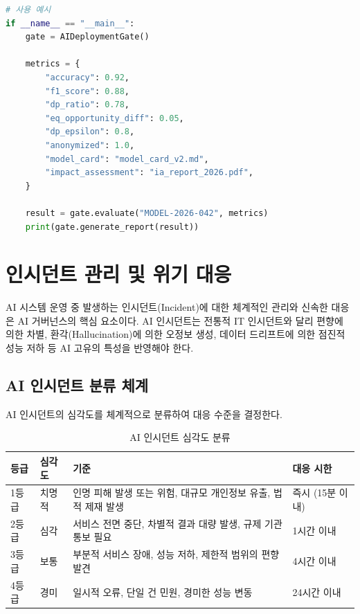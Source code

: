 \begin{lstlisting}[language=Python, caption={Policy-as-Code 종합 구현: 배포 게이트}, label={lst:pac_full}]
# 사용 예시
if __name__ == "__main__":
    gate = AIDeploymentGate()

    metrics = {
        "accuracy": 0.92,
        "f1_score": 0.88,
        "dp_ratio": 0.78,
        "eq_opportunity_diff": 0.05,
        "dp_epsilon": 0.8,
        "anonymized": 1.0,
        "model_card": "model_card_v2.md",
        "impact_assessment": "ia_report_2026.pdf",
    }

    result = gate.evaluate("MODEL-2026-042", metrics)
    print(gate.generate_report(result))
\end{lstlisting}

\section{인시던트 관리 및 위기 대응}
\label{sec:5.6}

AI 시스템 운영 중 발생하는 인시던트(Incident)에 대한 체계적인 관리와 신속한 대응은 AI 거버넌스의 핵심 요소이다. AI 인시던트는 전통적 IT 인시던트와 달리 편향에 의한 차별, 환각(Hallucination)에 의한 오정보 생성, 데이터 드리프트에 의한 점진적 성능 저하 등 AI 고유의 특성을 반영해야 한다.

\subsection{AI 인시던트 분류 체계}
\label{sec:5.6.1}

AI 인시던트의 심각도를 체계적으로 분류하여 대응 수준을 결정한다.

\begin{table}[htbp]
\centering
\caption{AI 인시던트 심각도 분류}
\label{tab:incident_severity}
\begin{tabularx}{\textwidth}{p{1.5cm}p{2cm}X p{2.5cm}}
\toprule
\textbf{등급} & \textbf{심각도} & \textbf{기준} & \textbf{대응 시한} \\
\midrule
1등급 & 치명적 & 인명 피해 발생 또는 위험, 대규모 개인정보 유출, 법적 제재 발생 & 즉시 (15분 이내) \\
\midrule
2등급 & 심각 & 서비스 전면 중단, 차별적 결과 대량 발생, 규제 기관 통보 필요 & 1시간 이내 \\
\midrule
3등급 & 보통 & 부분적 서비스 장애, 성능 저하, 제한적 범위의 편향 발견 & 4시간 이내 \\
\midrule
4등급 & 경미 & 일시적 오류, 단일 건 민원, 경미한 성능 변동 & 24시간 이내 \\
\bottomrule
\end{tabularx}
\end{table}


